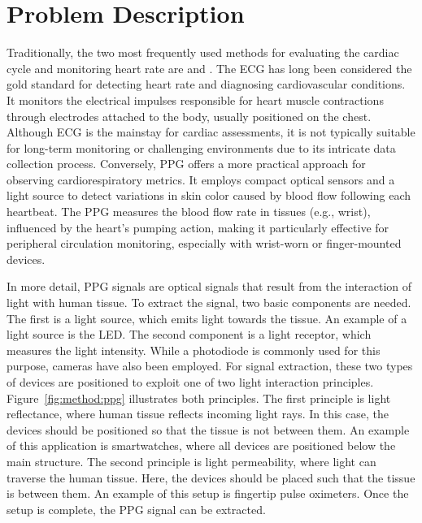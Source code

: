 \section{Problem Description}
\label{sec:problem}

Traditionally, the two most frequently used methods for evaluating the cardiac cycle and monitoring heart rate are  and . The \gls{ECG} has long been considered the gold standard for detecting heart rate and diagnosing cardiovascular conditions. It monitors the electrical impulses responsible for heart muscle contractions through electrodes attached to the body, usually positioned on the chest. Although \gls{ECG} is the mainstay for cardiac assessments, it is not typically suitable for long-term monitoring or challenging environments due to its intricate data collection process. Conversely, \gls{PPG} offers a more practical approach for observing cardiorespiratory metrics. It employs compact optical sensors and a light source to detect variations in skin color caused by blood flow following each heartbeat. The \gls{PPG} measures the blood flow rate in tissues (e.g., wrist), influenced by the heart's pumping action, making it particularly effective for peripheral circulation monitoring, especially with wrist-worn or finger-mounted devices.



In more detail, \gls{PPG} signals are optical signals that result from the interaction of light with human tissue. To extract the signal, two basic components are needed. The first is a light source, which emits light towards the tissue. An example of a light source is the \gls{LED}. The second component is a light receptor, which measures the light intensity. While a photodiode is commonly used for this purpose, cameras have also been employed. For signal extraction, these two types of devices are positioned to exploit one of two light interaction principles. Figure~\ref{fig:method:ppg} illustrates both principles. The first principle is light reflectance, where human tissue reflects incoming light rays. In this case, the devices should be positioned so that the tissue is not between them. An example of this application is smartwatches, where all devices are positioned below the main structure. The second principle is light permeability, where light can traverse the human tissue. Here, the devices should be placed such that the tissue is between them. An example of this setup is fingertip pulse oximeters. Once the setup is complete, the \gls{PPG} signal can be extracted.

